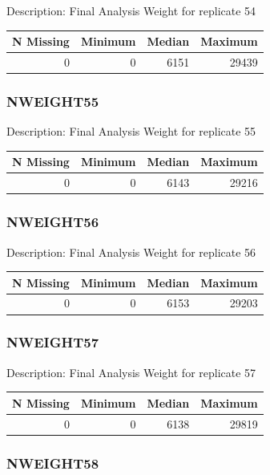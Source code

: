 \documentclass[
]{krantz}
\begin{document}
Description: Final Analysis Weight for replicate 54

\begin{tabular}[t]{r|r|r|r}
\hline
N Missing & Minimum & Median & Maximum\\
\hline
0 & 0 & 6151 & 29439\\
\hline
\end{tabular}

\hypertarget{nweight55}{%
\subsubsection*{NWEIGHT55}\label{nweight55}}


Description: Final Analysis Weight for replicate 55

\begin{tabular}[t]{r|r|r|r}
\hline
N Missing & Minimum & Median & Maximum\\
\hline
0 & 0 & 6143 & 29216\\
\hline
\end{tabular}

\hypertarget{nweight56}{%
\subsubsection*{NWEIGHT56}\label{nweight56}}


Description: Final Analysis Weight for replicate 56

\begin{tabular}[t]{r|r|r|r}
\hline
N Missing & Minimum & Median & Maximum\\
\hline
0 & 0 & 6153 & 29203\\
\hline
\end{tabular}

\hypertarget{nweight57}{%
\subsubsection*{NWEIGHT57}\label{nweight57}}


Description: Final Analysis Weight for replicate 57

\begin{tabular}[t]{r|r|r|r}
\hline
N Missing & Minimum & Median & Maximum\\
\hline
0 & 0 & 6138 & 29819\\
\hline
\end{tabular}

\hypertarget{nweight58}{%
\subsubsection*{NWEIGHT58}\label{nweight58}}
\end{document}
